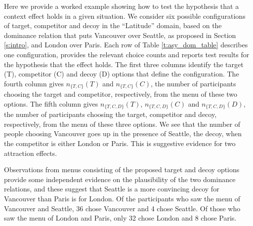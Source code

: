 \documentclass[11pt,letter]{article}
\newcommand{\menu}{menu}
\begin{document}
\begin{table}
  
  \caption{Data and test results for six candidate attraction effects in the Latitude domain. Each row gives a configuration of target, competitor and decoy options where we might expect an attraction effect. The fourth column gives the numbers of participants choosing the target and competitor when the menu is this pair of options. The fifth column gives the numbers of participants choosing the target, competitor and decoy when the menu is the set of these three options. The inconsistent but compact notation in the 4th and 5th column names is used only here.
  The sixth column gives the posterior probability of the hypothesis that the attraction effect holds. The last two columns give the Bayes factor and (natural) log Bayes factor in favour of the hypothesis that the attraction effect holds.}
  \label{t:asy_dom_table}
\end{table}

Here we provide a worked example showing how to test the hypothesis that a context effect holds in a given situation.
We consider six possible configurations of target, competitor and decoy in the ``Latitude'' domain, based on the dominance relation that puts Vancouver over Seattle, as proposed in Section \ref{s:intro}, and London over Paris.
Each row of Table \ref{t:asy_dom_table} describes one configuration, provides the relevant choice counts and reports test results for the hypothesis that the effect holds.
The first three columns identify the target (T), competitor (C) and decoy (D) options that define the configuration.
The fourth column gives $n_{\{T,C\}}(T)$ and $n_{\{T,C\}}(C)$, the number of participants choosing the target and competitor, respectively, from the \menu{} of these two options.
The fifth column gives $n_{\{T,C,D\}}(T)$, $n_{\{T,C,D\}}(C)$ and $n_{\{T,C,D\}}(D)$, the number of participants choosing the target, competitor and decoy, respectively, from the \menu{} of these three options.
We see that the number of people choosing Vancouver goes up in the presence of Seattle, the decoy, when the competitor is either London or Paris.
This is suggestive evidence for two attraction effects.

Observations from menus consisting of the proposed target and decoy options provide some independent evidence on the plausibility of the two dominance relations, and these suggest that Seattle is a more convincing decoy for Vancouver than Paris is for London.
Of the participants who saw the menu of Vancouver and Seattle, 36 chose Vancouver and 4 chose Seattle.
Of those who saw the menu of London and Paris, only 32 chose London and 8 chose Paris.
\end{document}
